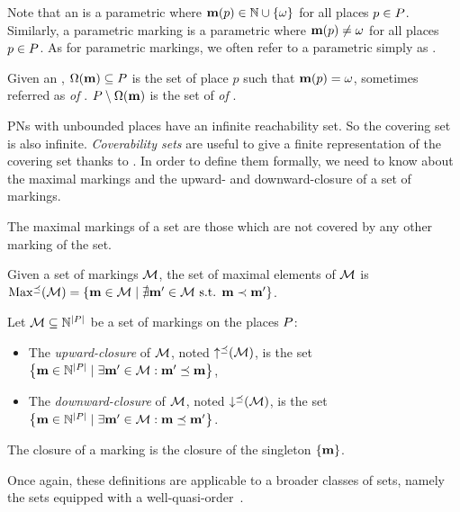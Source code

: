 Note that an \omark \mar is a parametric \omark where $\mathbf{m}(p) \in \mathbb{N} \cup \{\omega\}$ for all places $p \in P$.
Similarly, a parametric marking \mar is a parametric \omark where $\mathbf{m}(p) \neq \omega$ for all places $p \in P$.
As for parametric markings, we often refer to a parametric \omark simply as \omark.

Given an \omark \mar, $\operatorname{\Omega}(\mathbf{m}) \subseteq P$ is the set of place $p$ such that $\mathbf{m}(p) = \omega$, sometimes referred as \emph{\oplaces of \mar}. $P \setminus \operatorname{\Omega}(\mathbf{m})$ is the set of \emph{\noplaces of \mar}.

\acp{PN} with unbounded places have an infinite reachability set.
So the covering set is also infinite.
\emph{Coverability sets} are useful to give a finite representation of the covering set thanks to \omarks.
In order to define them formally, we need to know about the maximal markings and the upward- and downward-closure of a set of markings.

The maximal markings of a set are those which are not covered by any other marking of the set.
\begin{defi}
  Given a set of markings $\mathcal{M}$, the set of maximal elements of $\mathcal{M}$ is
  $\operatorname{Max^\preceq}(\mathcal{M}) = \left\{ \mathbf{m} \in \mathcal{M} \mid \nexists \mathbf{m}' \in \mathcal{M} \text{ s.t. } \mathbf{m} \prec \mathbf{m}' \right\}$.
\end{defi}

\begin{defi}
  Let $\mathcal{M} \subseteq \mathbb{N}^{\left|P\right|}$ be a set of markings on the places $P$:
  \begin{itemize}
    \item The \emph{upward-closure} of $\mathcal{M}$, noted $\operatorname{\uparrow^\preceq}(\mathcal{M})$, is the set
      $\left\{\mathbf{m} \in \mathbb{N}^{\left|P\right|} \mid \exists \mathbf{m}' \in \mathcal{M} : \mathbf{m}' \preceq \mathbf{m}\right\}$,
    \item The \emph{downward-closure} of $\mathcal{M}$, noted $\operatorname{\downarrow^\preceq}(\mathcal{M})$, is the set
      $\left\{\mathbf{m} \in \mathbb{N}^{\left|P\right|} \mid \exists \mathbf{m}' \in \mathcal{M} : \mathbf{m} \preceq \mathbf{m}'\right\}$.
  \end{itemize}
  The closure of a marking \mar is the closure of the singleton $\{\mathbf{m}\}$.
\end{defi}

Once again, these definitions are applicable to
a broader classes of sets, namely the sets equipped with a well-quasi-order~\citep{Abdulla96}.

